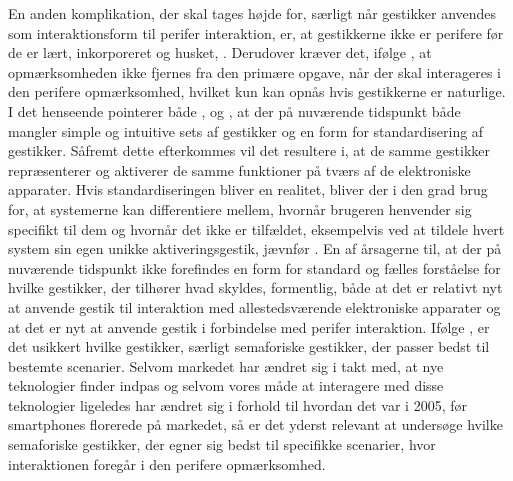 En anden komplikation, der skal tages højde for, særligt når gestikker anvendes som interaktionsform til perifer interaktion, er, at gestikkerne ikke er perifere før de er lært, inkorporeret og husket, \parencite[s. 16]{PDF:PIEmbeddingHCIOnTheRelevance}. Derudover kræver det, ifølge \textcite[s. 16]{PDF:PIEmbeddingHCIOnTheRelevance}, at opmærksomheden ikke fjernes fra den primære opgave, når der skal interageres i den perifere opmærksomhed, hvilket kun kan opnås hvis gestikkerne er naturlige. I det henseende pointerer både \textcite[s. 8]{PDF:NaturalUserInterfaces}, \textcite[s. 26]{PDF:ATaxonomyOfGestures} og \textcite[s. 19]{PDF:PIEmbeddingHCIOnTheRelevance}, at der på nuværende tidspunkt både mangler simple og intuitive sets af gestikker og en form for standardisering af gestikker. Såfremt dette efterkommes vil det resultere i, at de samme gestikker repræsenterer og aktiverer de samme funktioner på tværs af de elektroniske apparater. Hvis standardiseringen bliver en realitet, bliver der i den grad brug for, at systemerne kan differentiere mellem, hvornår brugeren henvender sig specifikt til dem og hvornår det ikke er tilfældet, eksempelvis ved at tildele hvert system sin egen unikke aktiveringsgestik, jævnfør . En af årsagerne til, at der på nuværende tidspunkt ikke forefindes en form for standard og fælles forståelse for hvilke gestikker, der tilhører hvad skyldes, formentlig, både at det er relativt nyt at anvende gestik til interaktion med allestedsværende elektroniske apparater og at det er nyt at anvende gestik i forbindelse med perifer interaktion. Ifølge \textcite[s. 28]{PDF:ATaxonomyOfGestures}, er det usikkert hvilke gestikker, særligt semaforiske gestikker, der passer bedst til bestemte scenarier. Selvom markedet har ændret sig i takt med, at nye teknologier finder indpas og selvom vores måde at interagere med disse teknologier ligeledes har ændret sig i forhold til hvordan det var i 2005, før smartphones florerede på markedet, så er det yderst relevant at undersøge hvilke semaforiske gestikker, der egner sig bedst til specifikke scenarier, hvor interaktionen foregår i den perifere opmærksomhed.

